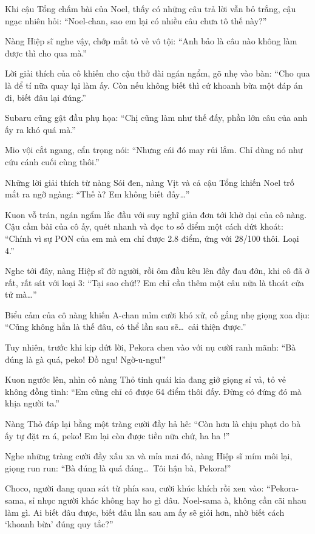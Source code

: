 \documentclass[../main.tex]{subfiles}
\begin{document}
Khi cậu Tổng chấm bài của Noel, thấy có những câu trả lời vẫn bỏ trắng, cậu ngạc nhiên hỏi: ``Noel-chan, sao em lại có nhiều câu chưa tô thế này?''

Nàng Hiệp sĩ nghe vậy, chớp mắt tỏ vẻ vô tội: ``Anh bảo là câu nào không làm được thì cho qua mà.''

Lời giải thích của cô khiến cho cậu thở dài ngán ngẩm, gõ nhẹ vào bàn: ``Cho qua là để tí nữa quay lại làm ấy. Còn nếu không biết thì cứ khoanh bừa một đáp án đi, biết đâu lại đúng.''

Subaru cũng gật đầu phụ họa: ``Chị cũng làm như thế đấy, phần lớn câu của anh ấy ra khó quá mà.''

Mio vội cắt ngang, cẩn trọng nói: ``Nhưng cái đó may rủi lắm. Chỉ dùng nó như cứu cánh cuối cùng thôi.''

Những lời giải thích từ nàng Sói đen, nàng Vịt và cả cậu Tổng khiến Noel trố mắt ra ngỡ ngàng: ``Thế à? Em không biết đấy\dots''

Kuon vỗ trán, ngán ngẩm lắc đầu với suy nghĩ giản đơn tới khờ dại của cô nàng. Cậu cầm bài của cô ấy, quét nhanh và đọc to số điểm một cách dứt khoát: ``Chính vì sự PON của em mà em chỉ được 2.8 điểm, ứng với 28/100 thôi. Loại 4.''

Nghe tới đây, nàng Hiệp sĩ đờ người, rồi ôm đầu kêu lên đầy đau đớn, khi cô đã ở rất, rất sát với loại 3: ``Tại sao chứ!? Em chỉ cần thêm một câu nữa là thoát cửa tử mà\dots''

Biểu cảm của cô nàng khiến A-chan mỉm cười khó xử, cố gắng nhẹ giọng xoa dịu: ``Cũng không hẳn là thế đâu, có thể lần sau sẽ\dots\ cải thiện được.''

Tuy nhiên, trước khi kịp dứt lời, Pekora chen vào với nụ cười ranh mãnh: ``Bà đúng là gà quá, peko! Đồ ngu! Ngờ-u-ngu!''

Kuon ngước lên, nhìn cô nàng Thỏ tinh quái kia đang giở giọng sỉ vả, tỏ vẻ không đồng tình: ``Em cũng chỉ có được 64 điểm thôi đấy. Đừng có đứng đó mà khịa người ta.''

Nàng Thỏ đáp lại bằng một tràng cười đầy hả hê: ``Còn hơn là chịu phạt do bà ấy tự đặt ra á, peko! Em lại còn được tiền nữa chứ, ha \uparrow ha \downarrow!''

Nghe những tràng cười đầy xấu xa và mỉa mai đó, nàng Hiệp sĩ mím môi lại, giọng run run: ``Bà đúng là quá đáng\dots\ Tôi hận bà, Pekora!''

Choco, người đang quan sát từ phía sau, cười khúc khích rồi xen vào: ``Pekora-sama, sỉ nhục người khác không hay ho gì đâu. Noel-sama à, không cần cãi nhau làm gì. Ai biết đâu được, biết đâu lần sau am ấy sẽ giỏi hơn, nhờ biết cách `khoanh bừa' đúng quy tắc?''
\end{document}
